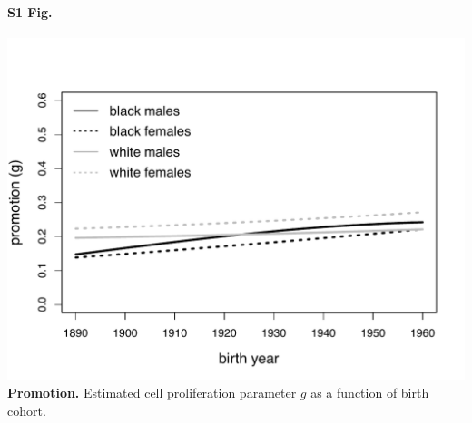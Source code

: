 \documentclass[10pt,letterpaper]{article}
\begin{document}
\paragraph*{\Large{S1 Fig.}}
\label{S1_Fig}
\includegraphics[scale=0.7, trim=0 0 0 0]{Promotion_g_SEER2016_by_BC.pdf}
{\bf Promotion.} Estimated cell proliferation parameter $g$ as a function of birth cohort.
\end{document}
